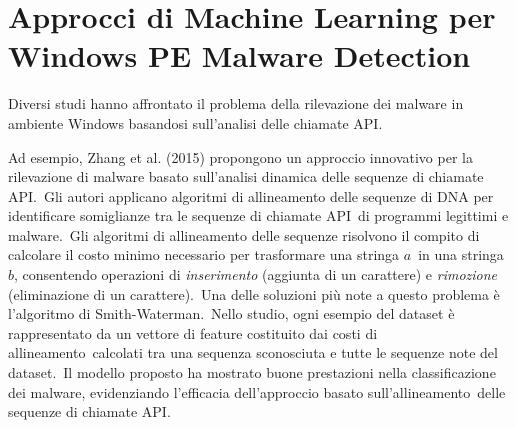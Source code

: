 \section{Approcci di Machine Learning per Windows PE Malware Detection}

Diversi studi hanno affrontato il problema della rilevazione dei malware in ambiente Windows
basandosi sull'analisi delle chiamate API.

Ad esempio, Zhang et al. (2015) propongono un approccio innovativo per la rilevazione di malware basato sull'analisi dinamica delle sequenze di chiamate API.\
Gli autori applicano algoritmi di allineamento delle sequenze di DNA per identificare somiglianze tra le sequenze di chiamate API\
di programmi legittimi e malware.\
Gli algoritmi di allineamento delle sequenze risolvono il compito di calcolare il costo minimo necessario per trasformare una stringa $a$\
in una stringa $b$, consentendo operazioni di \textit{inserimento} (aggiunta di un carattere) e \textit{rimozione} (eliminazione di un carattere).\
Una delle soluzioni più note a questo problema è l'algoritmo di Smith-Waterman.\
Nello studio, ogni esempio del dataset è rappresentato da un vettore di feature costituito dai costi di allineamento\
calcolati tra una sequenza sconosciuta e tutte le sequenze note del dataset.\
Il modello proposto ha mostrato buone prestazioni nella classificazione dei malware, evidenziando l'efficacia dell'approccio basato sull'allineamento\
delle sequenze di chiamate API.

